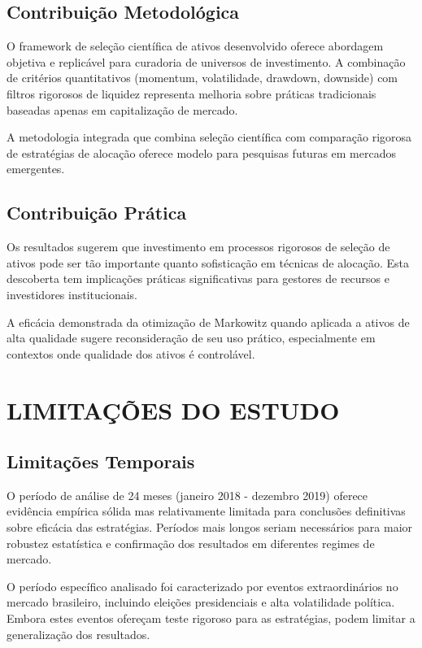 \subsection{Contribuição Metodológica}

O framework de seleção científica de ativos desenvolvido oferece abordagem objetiva e replicável para curadoria de universos de investimento. A combinação de critérios quantitativos (momentum, volatilidade, drawdown, downside) com filtros rigorosos de liquidez representa melhoria sobre práticas tradicionais baseadas apenas em capitalização de mercado.

A metodologia integrada que combina seleção científica com comparação rigorosa de estratégias de alocação oferece modelo para pesquisas futuras em mercados emergentes.

\subsection{Contribuição Prática}

Os resultados sugerem que investimento em processos rigorosos de seleção de ativos pode ser tão importante quanto sofisticação em técnicas de alocação. Esta descoberta tem implicações práticas significativas para gestores de recursos e investidores institucionais.

A eficácia demonstrada da otimização de Markowitz quando aplicada a ativos de alta qualidade sugere reconsideração de seu uso prático, especialmente em contextos onde qualidade dos ativos é controlável.

\section{LIMITAÇÕES DO ESTUDO}

\subsection{Limitações Temporais}

O período de análise de 24 meses (janeiro 2018 - dezembro 2019) oferece evidência empírica sólida mas relativamente limitada para conclusões definitivas sobre eficácia das estratégias. Períodos mais longos seriam necessários para maior robustez estatística e confirmação dos resultados em diferentes regimes de mercado.

O período específico analisado foi caracterizado por eventos extraordinários no mercado brasileiro, incluindo eleições presidenciais e alta volatilidade política. Embora estes eventos ofereçam teste rigoroso para as estratégias, podem limitar a generalização dos resultados.

